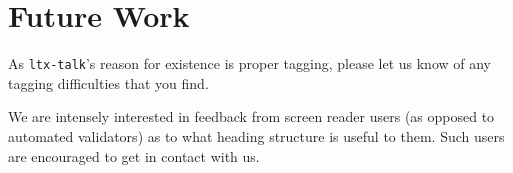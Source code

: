 \documentclass{ltugboat}
\newcommand{\ltxtalk}{\texttt{ltx-talk}}
\begin{document}
\section{Future Work}

As \ltxtalk's reason for existence is proper tagging,
please let us know of any tagging difficulties that you find.

We are intensely interested in feedback from screen reader users
(as opposed to automated validators)
as to what heading structure is useful to them.
Such users are encouraged to get in contact with us.


%






\makesignature
\end{document}
